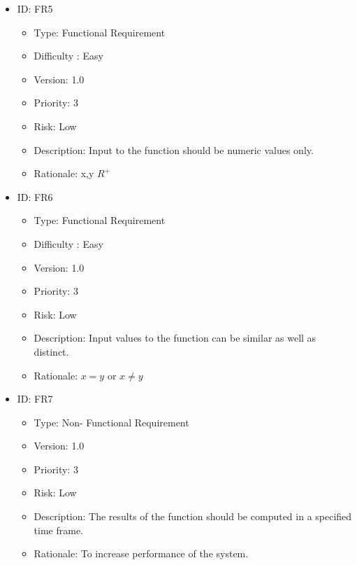 \documentclass[12pt]{report}
\begin{document}
\begin{itemize}
\item ID: FR5
\begin{itemize}
\item Type: Functional Requirement
\item Difficulty : Easy
\item Version:  1.0
\item Priority: 3
\item Risk: Low
\item Description: Input to the function should be numeric values only.
\item Rationale: x,y \in $R^+$
\end{itemize}

\item ID: FR6
\begin{itemize}
\item Type: Functional Requirement
\item Difficulty : Easy
\item Version:  1.0
\item Priority: 3
\item Risk: Low
\item Description: Input values to the function can be similar as well as distinct.
\item Rationale: $x=y$ or $x\neq y$
\end{itemize}

\item ID: FR7
\begin{itemize}
\item Type: Non- Functional Requirement
\item Version:  1.0
\item Priority: 3
\item Risk: Low
\item Description: The results of the function should be computed in a specified time frame.
\item Rationale: To increase performance of the system.
\end{itemize}
\end{itemize}
\end{document}

